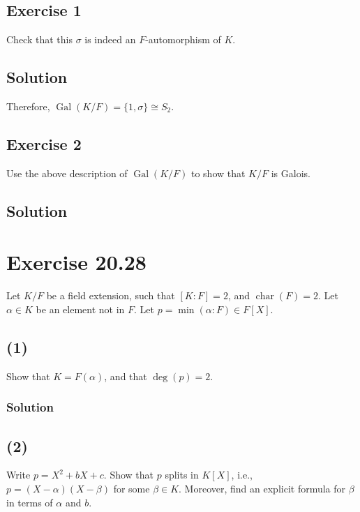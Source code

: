 \documentclass[fleqn]{article}
\DeclareMathOperator{\Gal}{Gal}
\DeclareMathOperator{\Char}{char}
\begin{document}
        \subsection{Exercise 1}
        Check that this $\sigma$ is indeed an $F$-automorphism of $K$.
            
            \subsection{Solution}
            
    Therefore, $\Gal(K/F) = \{1, \sigma\} \cong S_2$.
        
        \subsection{Exercise 2}
        Use the above description of $\Gal(K/F)$ to show that $K/F$ is Galois.
            
            \subsection{Solution}
            
    
    \section{Exercise 20.28}
    Let $K/F$ be a field extension, such that $[K : F] = 2$, and $\Char(F) = 2$.  Let $\alpha \in K$ be an element not in $F$.  Let $p = \min(\alpha : F) \in F[X]$.
        
        \subsection{(1)}
        Show that $K = F(\alpha)$, and that $\deg(p) = 2$.
            
            \subsubsection{Solution}
            
        
        \subsection{(2)}
        Write $p = X^2 + bX + c$.  Show that $p$ splits in $K[X]$, i.e., $p = (X - \alpha)(X - \beta)$ for some $\beta \in K$.  Moreover, find an explicit formula for $\beta$ in terms of $\alpha$ and $b$.
            
\end{document}
